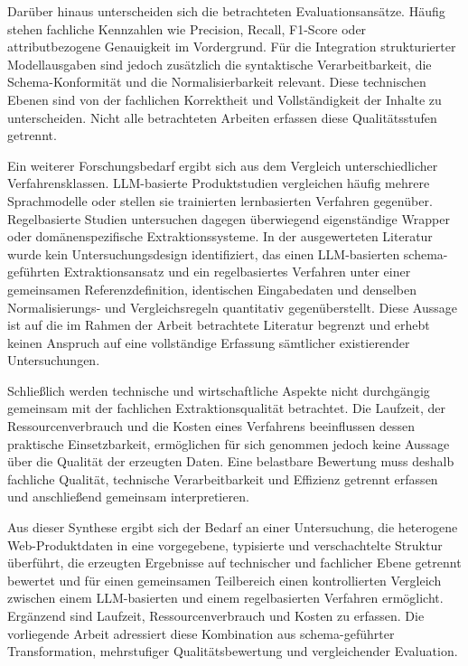 Darüber hinaus unterscheiden sich die betrachteten Evaluationsansätze. Häufig stehen fachliche Kennzahlen wie Precision, Recall, F1-Score oder attributbezogene 
Genauigkeit im Vordergrund. Für die Integration strukturierter Modellausgaben sind jedoch zusätzlich die syntaktische Verarbeitbarkeit, die Schema-Konformität und 
die Normalisierbarkeit relevant. Diese technischen Ebenen sind von der fachlichen Korrektheit und Vollständigkeit der Inhalte zu unterscheiden. Nicht alle betrachteten 
Arbeiten erfassen diese Qualitätsstufen getrennt.

Ein weiterer Forschungsbedarf ergibt sich aus dem Vergleich unterschiedlicher Verfahrensklassen. LLM-basierte Produktstudien vergleichen häufig mehrere Sprachmodelle 
oder stellen sie trainierten lernbasierten Verfahren gegenüber. Regelbasierte Studien untersuchen dagegen überwiegend eigenständige Wrapper oder domänenspezifische 
Extraktionssysteme. In der ausgewerteten Literatur wurde kein Untersuchungsdesign identifiziert, das einen LLM-basierten schema-geführten Extraktionsansatz und ein 
regelbasiertes Verfahren unter einer gemeinsamen Referenzdefinition, identischen Eingabedaten und denselben Normalisierungs- und Vergleichsregeln quantitativ gegenüberstellt. 
Diese Aussage ist auf die im Rahmen der Arbeit betrachtete Literatur begrenzt und erhebt keinen Anspruch auf eine vollständige Erfassung sämtlicher existierender Untersuchungen.

Schließlich werden technische und wirtschaftliche Aspekte nicht durchgängig gemeinsam mit der fachlichen Extraktionsqualität betrachtet. Die Laufzeit, der Ressourcenverbrauch 
und die Kosten eines Verfahrens beeinflussen dessen praktische Einsetzbarkeit, ermöglichen für sich genommen jedoch keine Aussage über die Qualität der erzeugten Daten. 
Eine belastbare Bewertung muss deshalb fachliche Qualität, technische Verarbeitbarkeit und Effizienz getrennt erfassen und anschließend gemeinsam interpretieren.

Aus dieser Synthese ergibt sich der Bedarf an einer Untersuchung, die heterogene Web-Produktdaten in eine vorgegebene, typisierte und verschachtelte Struktur überführt, 
die erzeugten Ergebnisse auf technischer und fachlicher Ebene getrennt bewertet und für einen gemeinsamen Teilbereich einen kontrollierten Vergleich zwischen einem 
LLM-basierten und einem regelbasierten Verfahren ermöglicht. Ergänzend sind Laufzeit, Ressourcenverbrauch und Kosten zu erfassen. Die vorliegende Arbeit adressiert 
diese Kombination aus schema-geführter Transformation, mehrstufiger Qualitätsbewertung und vergleichender Evaluation.